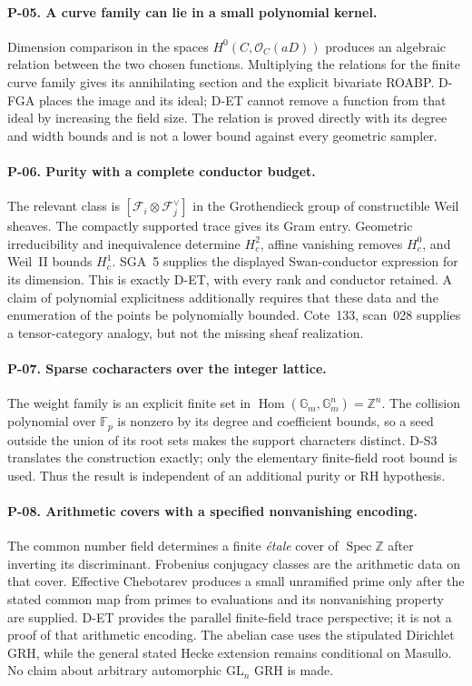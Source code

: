 \paragraph{P-05. A curve family can lie in a small polynomial kernel.}
Dimension comparison in the spaces $H^0(C,\mathcal O_C(aD))$ produces an algebraic relation between the two chosen functions. Multiplying the relations for the finite curve family gives its annihilating section and the explicit bivariate ROABP. D-FGA places the image and its ideal; D-ET cannot remove a function from that ideal by increasing the field size. The relation is proved directly with its degree and width bounds and is not a lower bound against every geometric sampler.

\paragraph{P-06. Purity with a complete conductor budget.}
The relevant class is $[\mathcal F_i\otimes\mathcal F_j^\vee]$ in the Grothendieck group of constructible Weil sheaves. The compactly supported trace gives its Gram entry. Geometric irreducibility and inequivalence determine $H_c^2$, affine vanishing removes $H_c^0$, and Weil~II bounds $H_c^1$. SGA~5 supplies the displayed Swan-conductor expression for its dimension. This is exactly D-ET, with every rank and conductor retained. A claim of polynomial explicitness additionally requires that these data and the enumeration of the points be polynomially bounded. Cote~133, scan~028 supplies a tensor-category analogy, but not the missing sheaf realization.

\paragraph{P-07. Sparse cocharacters over the integer lattice.}
The weight family is an explicit finite set in $\operatorname{Hom}(\mathbb G_m,\mathbb G_m^n)=\mathbb Z^n$. The collision polynomial over $\mathbb F_p$ is nonzero by its degree and coefficient bounds, so a seed outside the union of its root sets makes the support characters distinct. D-S3 translates the construction exactly; only the elementary finite-field root bound is used. Thus the result is independent of an additional purity or RH hypothesis.

\paragraph{P-08. Arithmetic covers with a specified nonvanishing encoding.}
The common number field determines a finite \emph{\'etale} cover of $\operatorname{Spec}\mathbb Z$ after inverting its discriminant. Frobenius conjugacy classes are the arithmetic data on that cover. Effective Chebotarev produces a small unramified prime only after the stated common map from primes to evaluations and its nonvanishing property are supplied. D-ET provides the parallel finite-field trace perspective; it is not a proof of that arithmetic encoding. The abelian case uses the stipulated Dirichlet GRH, while the general stated Hecke extension remains conditional on Masullo. No claim about arbitrary automorphic $\mathrm{GL}_n$ GRH is made.

